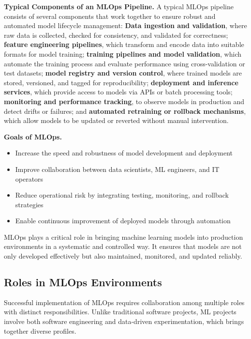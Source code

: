 {\bf Typical Components of an MLOps Pipeline.} A typical MLOps pipeline consists of several components that work together to ensure robust and automated model lifecycle management: 
\textbf{Data ingestion and validation}, where raw data is collected, checked for consistency, and validated for correctness; 
\textbf{feature engineering pipelines}, which transform and encode data into suitable formats for model training; 
\textbf{training pipelines and model validation}, which automate the training process and evaluate performance using cross-validation or test datasets; 
\textbf{model registry and version control}, where trained models are stored, versioned, and tagged for reproducibility; 
\textbf{deployment and inference services}, which provide access to models via APIs or batch processing tools; 
\textbf{monitoring and performance tracking}, to observe models in production and detect drifts or failures; and 
\textbf{automated retraining or rollback mechanisms}, which allow models to be updated or reverted without manual intervention.


{\bf Goals of MLOps.}
\begin{itemize}
	\item Increase the speed and robustness of model development and deployment
	\item Improve collaboration between data scientists, ML engineers, and IT operators
	\item Reduce operational risk by integrating testing, monitoring, and rollback strategies
	\item Enable continuous improvement of deployed models through automation
\end{itemize}

MLOps plays a critical role in bringing machine learning models into production environments in a systematic and controlled way. It ensures that models are not only developed effectively but also maintained, monitored, and updated reliably.


%
\subsection{Roles in MLOps Environments}

Successful implementation of MLOps requires collaboration among multiple roles with distinct responsibilities. Unlike traditional software projects, ML projects involve both software engineering and data-driven experimentation, which brings together diverse profiles.

